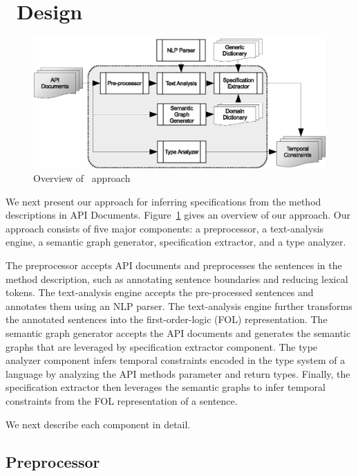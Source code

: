 \section{\tool\ Design}
\label{sec:approach}

\begin{figure}
	\centering
		\includegraphics[scale=0.45]{approach.eps}
	\caption{Overview of \tool\ approach}
	\label{fig:approachOverview}
\end{figure}

We next present our approach for inferring specifications from the method descriptions in API Documents.
Figure~\ref{fig:approachOverview} gives an overview of our approach.
Our approach consists of five major components: a preprocessor, a text-analysis engine, a semantic graph generator, specification extractor, and a type analyzer.

The preprocessor accepts API documents and preprocesses the sentences in the method description, such as annotating sentence boundaries and reducing lexical tokens.
The text-analysis engine accepts the pre-processed sentences and annotates them using an NLP parser.
The text-analysis engine further transforms the annotated sentences into the first-order-logic (FOL) representation. The semantic graph generator accepts the API documents and generates the semantic graphs that are leveraged by specification extractor component.
The type analyzer component infers temporal constraints encoded in the type system of a language by analyzing the API methods parameter and return types.
Finally, the specification extractor then leverages the semantic graphs to infer temporal constraints from the FOL representation of a sentence.

We next describe each component in detail.


\subsection{Preprocessor}
\label{sub:prep}

